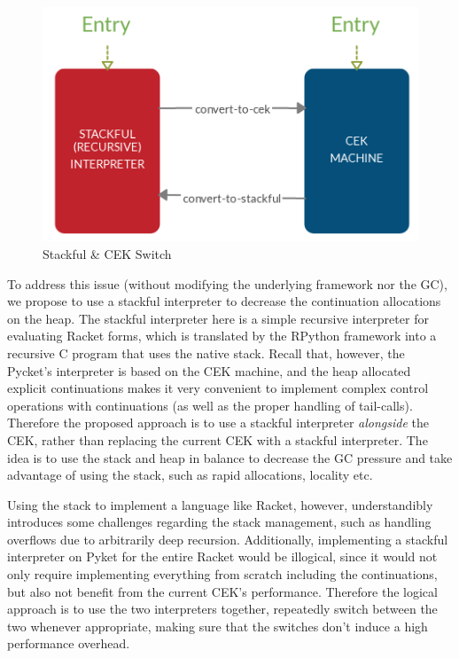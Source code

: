 \begin{figure}
  \vspace{-0.4cm}
  \begin{mdframed}
      \centering
  \includegraphics[scale=0.15]{img/cek-stackful-switch}
  \caption[hede]{Stackful \& CEK Switch}
  \label{fig:cek--switch-stack}
  \end{mdframed}
\end{figure}

To address this issue (without modifying the underlying framework nor
the GC), we propose to use a stackful interpreter to decrease the
continuation allocations on the heap. The stackful interpreter here is
a simple recursive interpreter for evaluating Racket forms, which is
translated by the RPython framework into a recursive C program that
uses the native stack. Recall that, however, the Pycket's interpreter
is based on the CEK machine, and the heap allocated explicit
continuations makes it very convenient to implement complex control
operations with continuations (as well as the proper handling of
tail-calls). Therefore the proposed approach is to use a stackful
interpreter \emph{alongside} the CEK, rather than replacing the
current CEK with a stackful interpreter. The idea is to use the stack
and heap in balance to decrease the GC pressure and take advantage of
using the stack, such as rapid allocations, locality etc.

Using the stack to implement a language like Racket, however,
understandibly introduces some challenges regarding the stack
management, such as handling overflows due to arbitrarily deep
recursion. Additionally, implementing a stackful interpreter on Pyket
for the entire Racket would be illogical, since it would not only
require implementing everything from scratch including the
continuations, but also not benefit from the current CEK's
performance. Therefore the logical approach is to use the two
interpreters together, repeatedly switch between the two whenever
appropriate, making sure that the switches don't induce a high
performance overhead.

